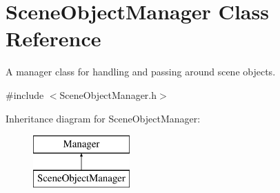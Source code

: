 \hypertarget{class_scene_object_manager}{}\section{Scene\+Object\+Manager Class Reference}
\label{class_scene_object_manager}


A manager class for handling and passing around scene objects.  




{\ttfamily \#include $<$Scene\+Object\+Manager.\+h$>$}

Inheritance diagram for Scene\+Object\+Manager\+:\begin{figure}[H]
\begin{center}
\leavevmode
\includegraphics[height=2.000000cm]{class_scene_object_manager}
\end{center}
\end{figure}
